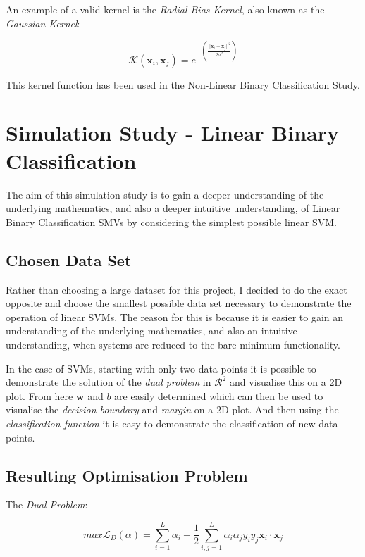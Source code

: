 \documentclass[10pt, a4paper,reqno]{amsart}
\begin{document}
An example of a valid kernel is the \emph{Radial Bias Kernel}, also known as the \emph{Gaussian Kernel}:

\begin{equation}
\mathcal{K}(\mathbf{x}_i, \mathbf{x}_j) = e^{-\left(\frac{||\mathbf{x}_i - \mathbf{x}_j||^2}{2\sigma^2}\right)}
\end{equation}

This kernel function has been used in the Non-Linear Binary Classification Study.


%
%
\clearpage\section{Simulation Study - Linear Binary Classification}

The aim of this simulation study is to gain a deeper understanding of the underlying mathematics, and also a deeper intuitive understanding, of Linear Binary Classification SMVs by considering the simplest possible linear SVM.

\subsection{Chosen Data Set}

Rather than choosing a large dataset for this project, I decided to do the exact opposite and choose the smallest possible data set necessary to demonstrate the operation of linear SVMs. The reason for this is because it is easier to gain an understanding of the underlying mathematics, and also an intuitive understanding, when systems are reduced to the bare minimum functionality.

In the case of SVMs, starting with only two data points it is possible to demonstrate the solution of the \emph{dual problem} in $\mathcal{R}^2$ and visualise this on a 2D plot. From here $\mathbf{w}$ and $b$ are easily determined which can then be used to visualise the \emph{decision boundary} and \emph{margin} on a 2D plot. And then using the \emph{classification function} it is easy to demonstrate the classification of new data points.


\subsection{Resulting Optimisation Problem}

The \emph{Dual Problem}:

\begin{equation}
max\mathcal{L}_D(\alpha) = \sum_{i=1}^{L}\alpha_i - \frac{1}{2}\sum_{i,j=1}^{L}\alpha_i \alpha_j y_i y_j\mathbf{x}_i\cdot\mathbf{x}_j
\end{equation}
\end{document}
